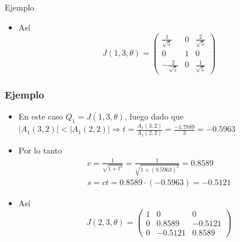 \documentclass{beamer}
\begin{document}
  \begin{frame}{Ejemplo}
    \begin{itemize}
      \item As\'i 
      $$
      J(1,3,\theta) = \left(\begin{array}{ccc}
                      \frac{1}{\sqrt{5}} & 0 & \frac{2}{\sqrt{5}}\\
                      0 & 1 & 0\\
                      -\frac{2}{\sqrt{5}} & 0 & \frac{1}{\sqrt{5}}
                    \end{array}\right)
      $$
    \end{itemize}
  \end{frame}
\begin{frame}
  \frametitle{Ejemplo}
  \begin{itemize}
    \item En este caso $Q_1=J(1,3,\theta)$, luego dado que $|A_1(3,2)|<|A_1(2,2)| \Rightarrow t=\frac{A_1(3,2)}{A_1(2,2)}=\frac{-1.7889}{3}=-0.5963$

  \item<2->Por lo tanto
  \begin{eqnarray}
  \nonumber c=\frac{1}{\sqrt{1+t^2}}=\frac{1}{\sqrt{1+(0.5963)^2}}=0.8589\\
  \nonumber s=ct=0.8589\cdot(-0.5963)=-0.5121
  \end{eqnarray}
  
  \item<3->As\'i 
  $$
  J(2,3,\theta) = \left(\begin{array}{ccc}
                  1 & 0 & 0\\
                  0 & 0.8589 & -0.5121\\
                  0 & -0.5121 & 0.8589
                \end{array}\right)
  $$
\end{itemize}
\end{frame}
\end{document}
